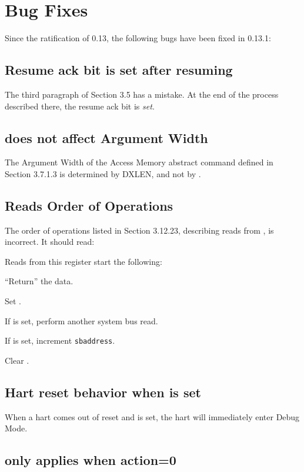 \chapter{Bug Fixes}

Since the ratification of 0.13, the following bugs have been fixed in 0.13.1:

\section{Resume ack bit is set after resuming}

The third paragraph of Section 3.5 has a mistake. At the end of the process
described there, the resume ack bit is \emph{set}.

\section{\Faamsize does not affect Argument Width}

The Argument Width of the Access Memory abstract command defined in Section
3.7.1.3 is determined by DXLEN, and not by \Faamsize.

\section{\Rsbdatazero Reads Order of Operations}

The order of operations listed in Section 3.12.23, describing reads from
\Rsbdatazero, is incorrect. It should read:

\begin{steps}{Reads from this register start the following:}
    \item ``Return'' the data.
    \item Set \Fsbbusy.
    \item If \Fsbreadondata is set, perform another system bus read.
    \item If \Fsbautoincrement is set, increment {\tt sbaddress}.
    \item Clear \Fsbbusy.
\end{steps}

\section{Hart reset behavior when \Fhaltreq is set}

When a hart comes out of reset and \Fhaltreq is set, the hart will immediately
enter Debug Mode.

\section{\Fmte only applies when action=0}

